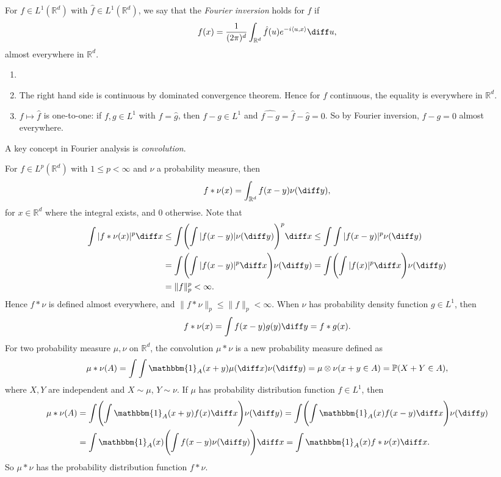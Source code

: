 \documentclass[12pt]{article}
\begin{document}

\begin{definition}
	For $f \in L^1(\mathbb{R}^{d})$ with $\hat f \in L^1(\mathbb{R}^{d})$, we say that the \emph{Fourier inversion} holds for $f$ if
	\[
	f(x) = \frac{1}{(2\pi)^d} \int_{\mathbb{R}^{d}} \hat f(u) e^{-i \langle u, x \rangle} \diff u,
	\]
	almost everywhere in $\mathbb{R}^{d}$.
\end{definition}

\begin{remark}
	\begin{enumerate}
	\item[]
	\item The right hand side is continuous by dominated convergence theorem. Hence for $f$ continuous, the equality is everywhere in $\mathbb{R}^{d}$.
	\item $f \mapsto \hat f$ is one-to-one: if $f, g \in L^1$ with $\hat f = \hat g$, then $f - g \in L^1$ and $\widehat{f-g} = \hat f - \hat g = 0$. So by Fourier inversion, $f - g = 0$ almost everywhere.
	\end{enumerate}
\end{remark}

A key concept in Fourier analysis is \emph{convolution}.

For $f \in L^p(\mathbb{R}^{d})$ with $1 \leq p < \infty$ and $\nu$ a probability measure, then
\[
f \ast \nu (x) = \int_{\mathbb{R}^{d}} f(x - y) \nu(\diff y),
\]
for $x \in \mathbb{R}^{d}$ where the integral exists, and $0$ otherwise. Note that
\begin{align*}
	\int |f \ast \nu(x)|^p \diff x &\leq \int \Biggl( \int |f(x - y)| \nu(\diff y) \Biggr)^p \diff x \leq \int \int |f(x - y)|^p \nu(\diff y) \\
				       &= \int \Biggl( \int |f(x - y)|^p \diff x \Biggr) \nu(\diff y)  = \int \Biggl( \int |f(x)|^p \diff x \Biggr) \nu(\diff y) \\
				       &= \|f\|_p^p < \infty.
\end{align*}
Hence $f \ast \nu$ is defined almost everywhere, and  $\|f \ast \nu\|_p \leq \|f\|_p < \infty$. When $\nu$ has probability density function $g \in L^1$, then
\[
f \ast \nu(x) = \int f(x - y) g(y) \diff y = f \ast g (x).
\]
For two probability measure $\mu, \nu$ on $\mathbb{R}^{d}$, the convolution $\mu \ast \nu$ is a new probability measure defined as
\[
\mu \ast \nu(A) = \int \int \mathbbm{1}_{A}(x+y) \mu(\diff x) \nu(\diff y) = \mu \otimes \nu(x + y \in A) = \mathbb{P}(X + Y \in A),
\]
where $X, Y$ are independent and $X \sim \mu$, $Y \sim \nu$. If $\mu$ has probability distribution function $f \in L^1$, then
\begin{align*}
	\mu \ast \nu(A) &= \int \Biggl( \int \mathbbm{1}_{A}(x + y) f(x) \diff x \Biggr) \nu(\diff y) = \int \Biggl( \int \mathbbm{1}_{A}(x) f(x - y) \diff x \Biggr) \nu(\diff y) \\
			&= \int \mathbbm{1}_{A}(x) \Biggl( \int f(x - y) \nu(\diff y) \Biggr) \diff x = \int \mathbbm{1}_{A}(x) f \ast \nu(x) \diff x.
\end{align*}
So $\mu \ast \nu$ has the probability distribution function $f \ast \nu$.
\end{document}
